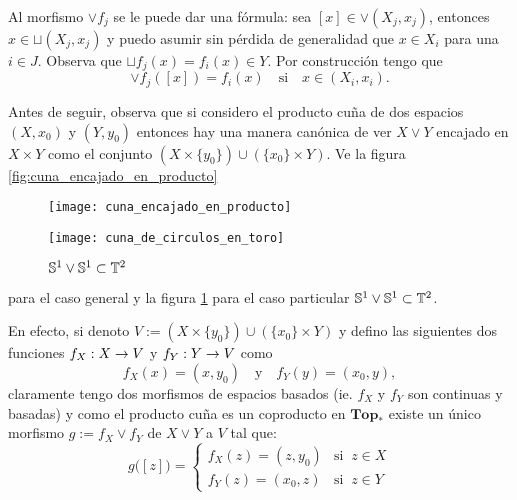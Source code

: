 \documentclass[../../topologia_algebraica]{subfiles}
\begin{document}
\begin{nota}
  Al morfismo $\vee f_j$ se le puede dar una f\'ormula: sea $[x]\in\vee(X_j,x_j)$, entonces
  $x\in\sqcup (X_j,x_j)$ y puedo asumir sin p\'erdida de generalidad que $x\in X_i$ para una
  $i\in J$. Observa que $\sqcup f_j(x)=f_i(x)\in Y$. Por construcci\'on tengo que
  \[
    \vee f_j([x])=f_i(x) \quad\text{si}\quad x\in(X_i,x_i).
  \]
\end{nota}

Antes de seguir, observa que si considero el producto cu\~na de dos espacios $(X,x_0)$ y $(Y,y_0)$
entonces hay una manera can\'onica de ver $X\vee Y$ encajado en $X\times Y$ como el conjunto
$(X\times \{y_0\})\cup(\{x_0\}\times Y)$. Ve la figura \ref{fig:cuna_encajado_en_producto}
\begin{figure}
 \begin{minipage}{.5\textwidth}
  \texttt{[image: cuna\_encajado\_en\_producto]}\centering
  \caption{$X\vee Y\subset X\times Y$}
  \label{fig:cuna_encajado_en_producto}
 \end{minipage}
 \begin{minipage}{.5\textwidth}
   \texttt{[image: cuna\_de\_circulos\_en\_toro]}\centering
  \caption{$\mathbb{S}^1\vee\mathbb{S}^1\subset \mathbb{T}^2$}
  \label{fig:cuna_de_circulos_en_toro}
 \end{minipage}
\end{figure}
para el caso general y la figura \ref{fig:cuna_de_circulos_en_toro} para el caso particular
$\mathbb{S}^1\vee\mathbb{S}^1\subset\mathbb{T}^2$.

En efecto, si denoto $V:=(X\times \{y_0\})\cup(\{x_0\}\times Y)$ y defino las siguientes dos
funciones $f_X:X\rightarrow V$ y $f_Y:Y\rightarrow V$ como
\[
  f_X(x)=(x,y_0) \quad\text{y}\quad f_Y(y)=(x_0,y),
\]
claramente tengo dos morfismos de espacios basados (ie. $f_X$ y $f_Y$ son continuas y basadas)
y como el producto cu\~na es un coproducto en $\mathbf{Top}_*$ existe un \'unico morfismo
$g:=f_X\vee f_Y$ de $X\vee Y$ a $V$ tal que:
\[
  g\big([z]\big)=
  \begin{cases}
    f_X(z)=(z,y_0) &\text{si}\;\; z\in X \\
    f_Y(z)=(x_0,z) &\text{si}\;\; z\in Y    
  \end{cases}
\]
\end{document}
